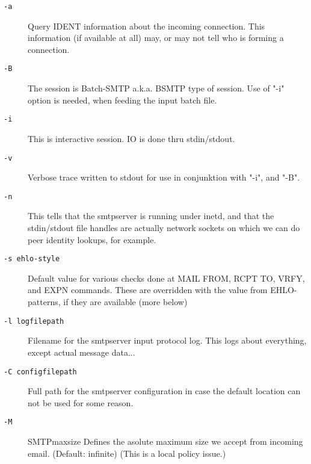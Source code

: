 \begin{description}
\item[{\tt -a}] \mbox{}

Query IDENT information about the incoming connection. This information (if available at all) may, or may not tell who is forming a connection.

\item[{\tt -B}] \mbox{}

The session is Batch-SMTP a.k.a. BSMTP type of session. Use of "-i" option is needed, when feeding the input batch file.

\item[{\tt -i}] \mbox{}

This is interactive session.  IO is done thru stdin/stdout.

\item[{\tt -v}] \mbox{}

Verbose trace written to stdout for use in conjunktion with "-i", and "-B".

\item[{\tt -n}] \mbox{}

This tells that the smtpserver is running under inetd, and that the stdin/stdout file handles are actually network sockets on which we can do peer identity lookups, for example.

\item[{\tt -s ehlo-style}] \mbox{}

Default value for various checks done at MAIL FROM, RCPT TO, VRFY, and EXPN commands. These are overridden with the value from EHLO-patterns, if they are available (more below)

\item[{\tt -l logfilepath}] \mbox{}

Filename for the smtpserver input protocol log. This logs about everything, except actual message data...

\item[{\tt -C configfilepath}] \mbox{}

Full path for the smtpserver configuration in case the default location can not be used for some reason.

\item[{\tt -M}] \mbox{}

SMTPmaxsize Defines the asolute maximum size we accept from incoming email. (Default: infinite) (This is a local policy issue.)

\end{description}


